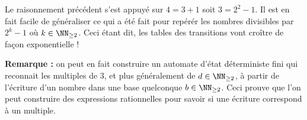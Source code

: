 Le raisonnement précédent s'est appuyé sur $4 = 3 + 1$ soit $3 = 2^2 - 1$. Il est en fait facile de généraliser ce qui a été fait pour repérér les nombres divisibles par $2^k - 1$ où $k \in \NN_{\geq 2}$.
Ceci étant dit, les tables des transitions vont croître de façon exponentielle !


\medskip


\textbf{Remarque :} on peut en fait construire un automate d'état déterministe fini qui reconnait les multiples de $3$, et plus généralement de $d \in \NN_{\geq 2}$, à partir de l'écriture d'un nombre dans une base quelconque $b \in \NN_{\geq 2}$.
Ceci prouve que l'on peut construire des expressions rationnelles pour savoir si une écriture correspond à un multiple.